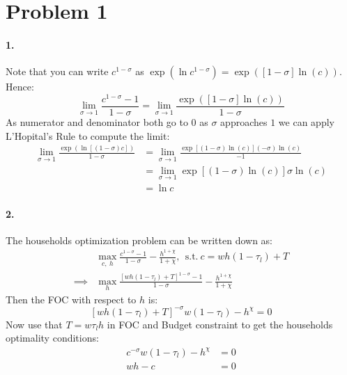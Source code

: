 \documentclass{article}
\begin{document}
\section*{Problem 1}
\paragraph{1.}
Note that you can write $c^{1 - \sigma}$ as $\exp\left(\ln c^{1 - \sigma}\right) = \exp\left(\left[1 - \sigma\right] \ln \left(c \right) \right)$. Hence:
\begin{equation*}
\lim_{\sigma \to 1} \frac{c^{1 - \sigma} - 1}{1 - \sigma} = \lim_{\sigma \to 1} \frac{\exp\left(\left[1 - \sigma\right] \ln \left(c \right) \right)}{1 - \sigma}
\end{equation*}
As numerator and denominator both go to $0$ as $\sigma $ approaches $1$ we can apply L'Hopital's Rule to compute the limit:
\begin{align*}
\lim_{\sigma \to 1} \frac{\exp\left(\ln\left[\left(1 - \sigma\right) c\right]\right)}{1 - \sigma} &= \lim_{\sigma \to 1} \frac{\exp\left[\left(1 - \sigma\right) \ln \left(c \right) \right] \left(-\sigma\right) \ln\left(c\right)}{-1} \\
 &= \lim_{\sigma \to 1} \exp\left[\left(1 - \sigma\right) \ln\left(c\right)\right] \sigma \ln \left(c\right) \\
 &= \ln c
\end{align*}

\paragraph{2.}
The households optimization problem can be written down as:
\begin{align*}
&\max_{c,~h} \frac{c^{1 - \sigma} - 1}{1 - \sigma} - \frac{h^{1 + \chi}}{1 + \chi}, ~~\text{s.t.}~c = w h \left(1 - \tau_l\right) + T \\
\implies &\max_h \frac{\left[w h \left(1 - \tau_l\right) + T\right]^{1 - \sigma} - 1}{1 - \sigma} - \frac{h^{1 + \chi}}{1 + \chi}
\end{align*}
Then the FOC with respect to $h$ is:
\begin{equation*}
\left[w h \left(1 - \tau_l\right) + T\right]^{-\sigma} w \left(1 - \tau_l\right) - h^\chi = 0
\end{equation*}
Now use that $T = w \tau_l h$ in FOC and Budget constraint to get the households optimality conditions:
\begin{align}
c^{-\sigma} w \left(1 - \tau_l\right) - h^\chi &= 0 \\
w h - c &= 0
\end{align}
\end{document}
